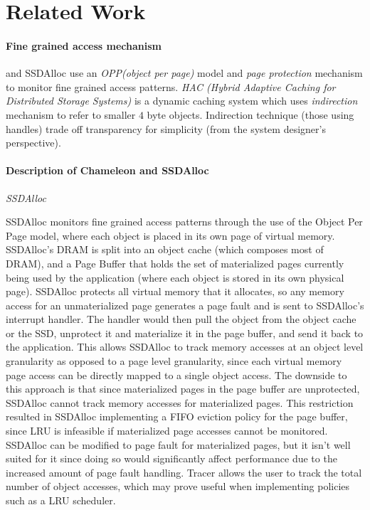 \section{Related Work}
\label{sec:related}
\paragraph{Fine grained access mechanism}
{\cite{Chameleon}} and SSDAlloc {\cite{SSDAlloc}} use an {\emph{OPP(object per page)}} model and {\emph{page protection}} mechanism to monitor fine grained access patterns. {\emph{HAC (Hybrid Adaptive Caching for Distributed Storage Systems)}} {\cite{castro1997hac}} is a dynamic caching system which uses {\emph{indirection}} mechanism to refer to smaller $4$ byte objects. Indirection technique (those using handles) trade off transparency for simplicity (from the system designer's perspective).

\paragraph{Description of Chameleon and SSDAlloc}
{\emph{SSDAlloc}}

SSDAlloc monitors fine grained access patterns through the use of the Object Per Page model, where each object is placed in its own page of virtual memory. SSDAlloc's DRAM is split into an object cache (which composes most of DRAM), and a Page Buffer that holds the set of materialized pages currently being used by the application (where each object is stored in its own physical page). SSDAlloc protects all virtual memory that it allocates, so any memory access for an unmaterialized page generates a page fault and is sent to SSDAlloc's interrupt handler. The handler would then pull the object from the object cache or the SSD, unprotect it and materialize it in the page buffer, and send it back to the application. This allows SSDAlloc to track memory accesses at an object level granularity as opposed to a page level granularity, since each virtual memory page access can be directly mapped to a single object access. The downside to this approach is that since materialized pages in the page buffer are unprotected, SSDAlloc cannot track memory accesses for materialized pages. This restriction resulted in SSDAlloc implementing a FIFO eviction policy for the page buffer, since LRU is infeasible if materialized page accesses cannot be monitored. SSDAlloc can be modified to page fault for materialized pages, but it isn't well suited for it since doing so would significantly affect performance due to the increased amount of page fault handling. Tracer allows the user to track the total number of object accesses, which may prove useful when implementing policies such as a LRU scheduler.

